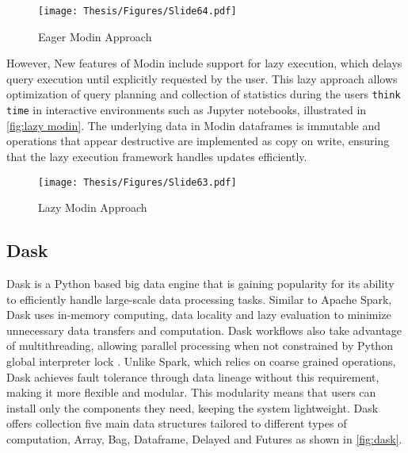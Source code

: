 \begin{figure}[h]
\centering
\texttt{[image: Thesis/Figures/Slide64.pdf]}
\caption{\label{fig:eager modin}Eager Modin Approach \cite{shi2021leveraging}}

\vspace{-20cm}
\end{figure}

\clearpage

However, New features of Modin include support for lazy execution, which delays query execution until explicitly requested by the user. This lazy approach allows optimization of query planning and collection of statistics during the users \texttt{think time} in interactive environments such as Jupyter notebooks, illustrated in \autoref{fig:lazy modin}. The underlying data in Modin dataframes is immutable and operations that appear destructive are implemented as copy on write, ensuring that the lazy execution framework handles updates efficiently. \cite{shi2021leveraging}



\begin{figure}[h]
\centering
\texttt{[image: Thesis/Figures/Slide63.pdf]}
\caption{\label{fig:lazy modin}Lazy Modin Approach \cite{shi2021leveraging}}
\end{figure}


\subsection{Dask}

Dask is a Python based big data engine that is gaining popularity for its ability to efficiently handle large-scale data processing tasks. Similar to Apache Spark, Dask uses in-memory computing, data locality and lazy evaluation to minimize unnecessary data transfers and computation. Dask workflows also take advantage of multithreading, allowing parallel processing when not constrained by Python global interpreter lock . Unlike Spark, which relies on coarse grained operations, Dask achieves fault tolerance through data lineage without this requirement, making it more flexible and modular. This modularity means that users can install only the components they need, keeping the system lightweight. Dask offers collection five main data structures tailored to different types of computation, Array, Bag, Dataframe, Delayed and Futures as shown in \autoref{fig:dask}. \cite{dugre2019performance}

